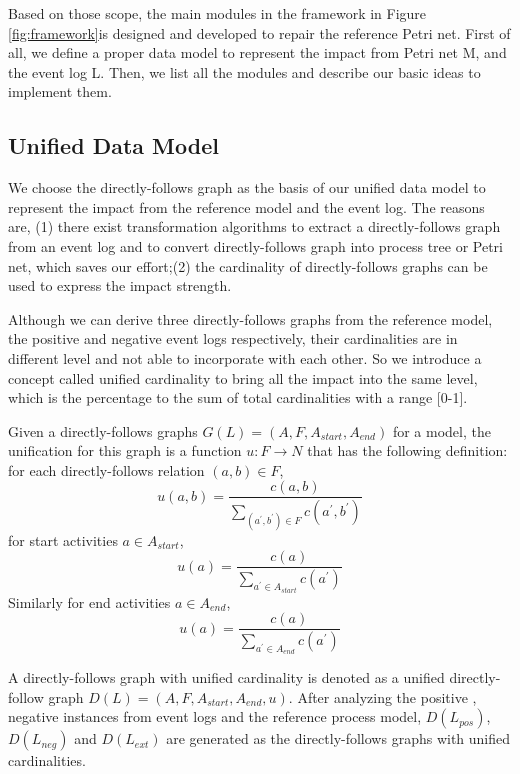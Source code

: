 Based on those scope, the main modules in the framework in Figure \ref{fig:framework}is designed and developed to repair the reference Petri net. First of all, we define a proper data model to represent the impact from Petri net M, and the event log L. Then, we list all the modules  and describe our basic ideas to implement them. 
\subsection{Unified Data Model}
We choose the directly-follows graph as the basis of our unified data model to represent the impact from the reference model and the event log. The reasons are, (1) there exist transformation algorithms to extract a directly-follows graph from an event log and to convert directly-follows graph into process tree or Petri net, which saves our effort;(2) the cardinality of directly-follows graphs can be used to express the impact strength.

Although we can derive three directly-follows graphs from the reference model, the positive and negative event logs respectively, their cardinalities are in different level and not able to incorporate with each other. So we introduce a concept called unified cardinality to bring all the impact into the same level, which is the percentage to the sum of total cardinalities with a range [0-1].
\begin{definition} 
	\label{def:car-unification}
	Given a directly-follows graphs $G(L)  = (A, F , A_{start}, A_{end})$ for a model, the unification for this graph is a function  $u:F\rightarrow N $ that has the following definition: \\
	for each directly-follows relation $(a,b) \in F$,
	\[ u(a,b) = \frac{c(a,b)}{\sum_{(a^\prime,b^\prime) \in F} c(a^\prime,b^\prime)}\]
	for start activities $a \in A_{start}$, 
	\[ u(a) = \frac{c(a)}{\sum_{a^\prime \in A_{start}} c(a^\prime)} \]
	Similarly for end activities $a \in A_{end}$,
	\[ u(a) = \frac{c(a)}{\sum_{a^\prime \in A_{end}} c(a^\prime)} \]
\end{definition}
A directly-follows graph with unified cardinality is denoted as a unified directly-follow graph $D(L)=(A, F , A_{start}, A_{end}, u)$. After analyzing the positive , negative instances from event logs and the reference process model, $D(L_{pos})$, $D(L_{neg})$ and $D(L_{ext})$ are generated as the directly-follows graphs with unified cardinalities.
